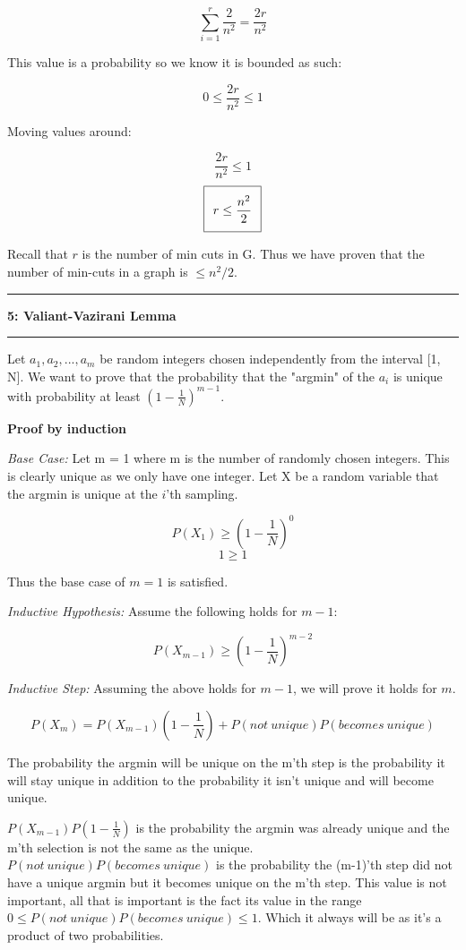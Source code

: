 \documentclass[11pt]{article}
\newcommand\question[2]{\vspace{.25in}\hrule\textbf{#1: #2}\vspace{.5em}\hrule\vspace{.10in}}
\begin{document}
 $$\sum_{i = 1}^r \frac{2}{n^2} = \frac{2r}{n^2}$$
 
 This value is a probability so we know it is bounded as such:
 
 $$0 \leq \frac{2r}{n^2} \leq 1$$
 
 Moving values around:
 
 $$\frac{2r}{n^2} \leq 1$$
 \begin{equation}
\setlength\fboxsep{0.25cm}
\setlength\fboxrule{0.4pt}
\boxed{r \leq \frac{n^2}{2}}
\end{equation}
 
 Recall that $r$ is the number of min cuts in G. Thus we have proven that the number of min-cuts in a graph is $\leq n^2/2$.


\question{5}{Valiant-Vazirani Lemma} 

Let $a_1, a_2, ... , a_m$ be random integers chosen independently from the interval [1, N]. We want to prove that the probability that the "argmin" of the $a_i$ is unique with probability at least $(1 - \frac{1}{N})^{m-1}$.

\textbf{Proof by induction}

\textit{Base Case:} Let m = 1 where m is the number of randomly chosen integers. This is clearly unique as we only have one integer. Let X be a random variable that the argmin is unique at the $i$'th sampling.

$$P(X_1) \geq (1 - \frac{1}{N})^0 $$
$$1 \geq 1$$

Thus the base case of $m = 1$ is satisfied.

\textit{Inductive Hypothesis:} Assume the following holds for $m - 1$:

$$P(X_{m-1}) \geq (1 - \frac{1}{N})^{m - 2}$$

\textit{Inductive Step:} Assuming the above holds for $m - 1$, we will prove it holds for $m$.

$$P(X_{m}) = P(X_{m-1})(1 - \frac{1}{N}) + P(not \ unique)P(becomes \ unique)$$

The probability the argmin will be unique on the m'th step is the probability it will stay unique in addition to the probability it isn't unique and will become unique. 

$P(X_{m-1})P(1 - \frac{1}{N})$ is the probability the argmin was already unique and the m'th selection is not the same as the unique. $P(not \ unique)P(becomes \ unique)$ is the probability the (m-1)'th step did not have a unique argmin but it becomes unique on the m'th step. This value is not important, all that is important is the fact its value in the range $0 \leq P(not \ unique)P(becomes \ unique) \leq 1$. Which it always will be as it's a product of two probabilities.
\end{document}
